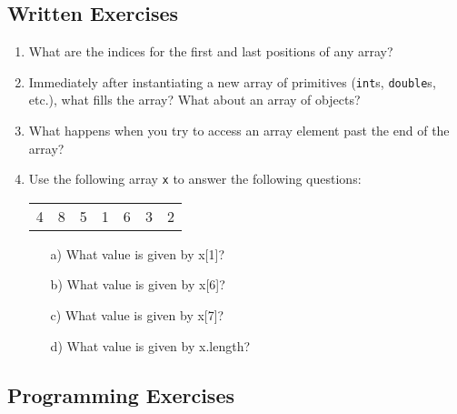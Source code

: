 \subsection{Written Exercises}

\begin{enumerate}

\item What are the indices for the first and last positions of any array?

\item Immediately after instantiating a new array of primitives (\verb|int|s, \verb|double|s, etc.), what fills the array? What about an array of objects?

\item What happens when you try to access an array element past the end of the array?

\item Use the following array \verb|x| to answer the following questions:
\begin{table}[h]
\begin{tabular}{lllllll}
4 & 8 & 5 & 1 & 6 & 3 & 2
\end{tabular}
\end{table}
\begin{enumerate}
\item[a)]What value is given by x[1]?
\item[b)]What value is given by x[6]?
\item[c)]What value is given by x[7]?
\item[d)]What value is given by x.length?
\end{enumerate}

\end{enumerate}

\subsection{Programming Exercises}

